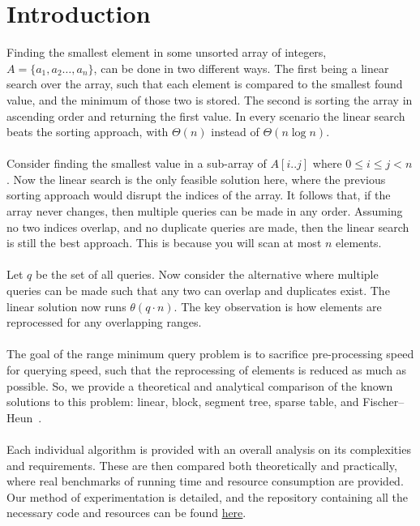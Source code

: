 \documentclass{article}
\theoremstyle{definition}
\begin{document}
\section{Introduction}
Finding the smallest element in some  unsorted array of integers, $A = \{a_1, a_2\dots, a_n\}$, can be done in two different ways.  The first being a linear search over the array, such that each element is compared to the smallest found value, and the minimum of those two is stored.  The second is sorting the array in ascending order and returning the first value.  In every scenario the linear search beats the sorting approach, with $\Theta(n)$ instead of $\Theta(n\log{n})$.
\\
\\
Consider finding the smallest value in a sub-array of $A[i..j]$ where $0 \le i \le j < n$. Now the linear search is the only feasible solution here, where the previous sorting approach would disrupt the indices of the array.  It follows that, if the array never changes, then multiple queries can be made in any order.  Assuming no two indices overlap, and no duplicate queries are made, then the linear search is still the best approach.  This is because you will scan at most $n$ elements.
\\
\\
Let $q$ be the set of all queries.  Now consider the alternative where multiple queries can be made such that any two can overlap and duplicates exist.  The linear solution now runs $\theta(q\cdot n)$.  The key observation is how elements are reprocessed for any overlapping ranges.
\\
\\
The goal of the range minimum query problem is to sacrifice pre-processing speed for querying speed, such that the reprocessing of elements is reduced as much as possible.  So, we provide a theoretical and analytical comparison of the known solutions to this problem: linear, block, segment tree, sparse table, and Fischer--Heun~\cite{fischer2006, cs166rmq2}.
\\
\\
Each individual algorithm is provided with an overall analysis on its complexities and requirements.  These are then compared both theoretically and practically, where real benchmarks of running time and resource consumption are provided.  Our method of experimentation is detailed, and the repository containing all the necessary code and resources can be found \href{https://github.com/replicantStarr/Range-Minimum-Query-Implementation-Comparisons}{here}.
\end{document}
